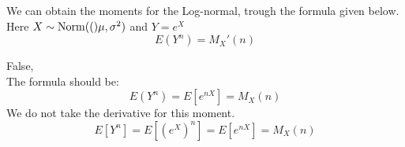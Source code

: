 \documentclass[tf-tutorial-all.tex]{subfiles}
\begin{document}
\begin{truefalse}
We can obtain the moments for the Log-normal, trough the formula given below.
Here $X \sim \mathrm{Norm}(()\mu, \sigma^{2})$ and $Y = e^{X}$
$$E(Y^{n}) =  M_{X}'(n) $$
    \begin{solution}
        False, 
        \\The formula should be:
        $$E(Y^{n}) = E[e^{n X}] = M_{X}(n) $$
        We do not take the derivative for this moment. 
        $$E[Y^{n}] = E[(e^{X}) ^{n}] = E[e^{nX}] = M_{X}(n)$$
    \end{solution}
\end{truefalse}
\end{document}
